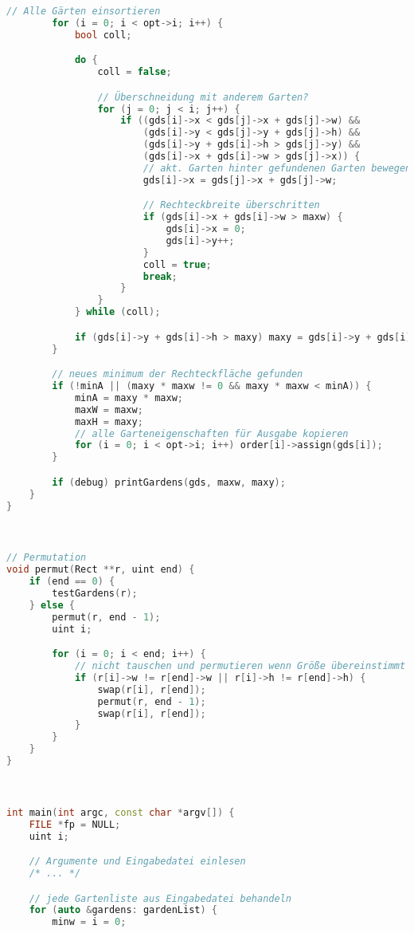 \documentclass[a4paper,10pt,ngerman]{scrartcl}
\begin{document}
\begin{lstlisting}[language=C++]
        // Alle Gärten einsortieren
        for (i = 0; i < opt->i; i++) {
            bool coll;

            do {
                coll = false;

                // Überschneidung mit anderem Garten?
                for (j = 0; j < i; j++) {
                    if ((gds[i]->x < gds[j]->x + gds[j]->w) &&
                        (gds[i]->y < gds[j]->y + gds[j]->h) &&
                        (gds[i]->y + gds[i]->h > gds[j]->y) &&
                        (gds[i]->x + gds[i]->w > gds[j]->x)) {
                        // akt. Garten hinter gefundenen Garten bewegen
                        gds[i]->x = gds[j]->x + gds[j]->w;

                        // Rechteckbreite überschritten
                        if (gds[i]->x + gds[i]->w > maxw) {
                            gds[i]->x = 0;
                            gds[i]->y++;
                        }
                        coll = true;
                        break;
                    }
                }
            } while (coll);

            if (gds[i]->y + gds[i]->h > maxy) maxy = gds[i]->y + gds[i]->h;
        }

        // neues minimum der Rechteckfläche gefunden
        if (!minA || (maxy * maxw != 0 && maxy * maxw < minA)) {
            minA = maxy * maxw;
            maxW = maxw;
            maxH = maxy;
            // alle Garteneigenschaften für Ausgabe kopieren
            for (i = 0; i < opt->i; i++) order[i]->assign(gds[i]);
        }

        if (debug) printGardens(gds, maxw, maxy);
    }
}



// Permutation
void permut(Rect **r, uint end) {
    if (end == 0) {
        testGardens(r);
    } else {
        permut(r, end - 1);
        uint i;

        for (i = 0; i < end; i++) {
            // nicht tauschen und permutieren wenn Größe übereinstimmt
            if (r[i]->w != r[end]->w || r[i]->h != r[end]->h) {
                swap(r[i], r[end]);
                permut(r, end - 1);
                swap(r[i], r[end]);
            }
        }
    }
}



int main(int argc, const char *argv[]) {
    FILE *fp = NULL;
    uint i;

    // Argumente und Eingabedatei einlesen
    /* ... */

    // jede Gartenliste aus Eingabedatei behandeln
    for (auto &gardens: gardenList) {
        minw = i = 0;


\end{lstlisting}
\end{document}
